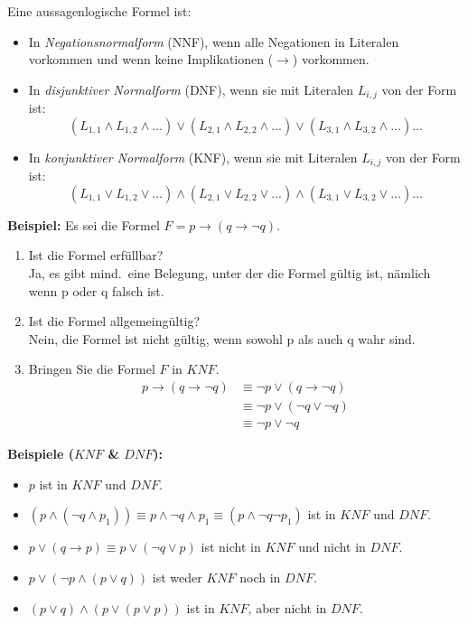 \begin{definition}{}
    Eine aussagenlogische Formel ist:
    \begin{itemize}
        \item In \emph{Negationsnormalform} (NNF), wenn alle Negationen in Literalen vorkommen und wenn keine Implikationen ($\rightarrow$) vorkommen.
        \item In \emph{disjunktiver Normalform} (DNF), wenn sie mit Literalen $L_{i,j}$ von der Form ist: \[(L_{1,1} \land L_{1,2} \land \dots) \lor (L_{2,1} \land L_{2,2} \land ...) \lor (L_{3,1} \land L_{3,2} \land ...)\dots\]
        \item In \emph{konjunktiver Normalform} (KNF), wenn sie mit Literalen $L_{i,j}$ von der Form ist: \[(L_{1,1} \lor L_{1,2} \lor \dots) \land (L_{2,1} \lor L_{2,2} \lor ...) \land (L_{3,1} \lor L_{3,2} \lor ...)\dots\]
    \end{itemize}
\end{definition}

\textbf{Beispiel:} Es sei die Formel $F = p \rightarrow (q \rightarrow \neg q).$
\begin{enumerate}
    \item Ist die Formel erfüllbar? \\
    Ja, es gibt mind.\ eine Belegung, unter der die Formel gültig ist, nämlich wenn p oder q falsch ist.
    \item Ist die Formel allgemeingültig? \\
    Nein, die Formel ist nicht gültig, wenn sowohl p als auch q wahr sind.
    \item Bringen Sie die Formel $F$ in $KNF$.
    \begin{align*}
        p \rightarrow (q \rightarrow \neg q) &\equiv \neg p \lor (q \rightarrow \neg q) \\
        &\equiv \neg p \lor (\neg q \lor \neg q) \\
        &\equiv \neg p \lor \neg q
    \end{align*}
\end{enumerate}

\textbf{Beispiele ($KNF$ \& $DNF$):}
\begin{itemize}
    \item $p$ ist in $KNF$ und $DNF$.
    \item $(p \land (\neg q \land p_1)) \equiv p \land \neg q \land p_1 \equiv (p \land \neg q \neg p_1)$ ist in $KNF$ und $DNF$.
    \item $p \lor (q \rightarrow p) \equiv p \lor (\neg q \lor p)$ ist nicht in $KNF$ und nicht in $DNF$.
    \item $p \lor (\neg p \land (p \lor q))$ ist weder $KNF$ noch in $DNF$.
    \item $(p \lor q) \land (p \lor (p \lor p))$ ist in $KNF$, aber nicht in $DNF$.
\end{itemize}

